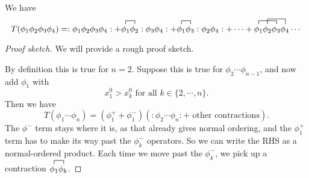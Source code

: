 \documentclass[a4paper]{article}
\begin{document}
\begin{eg}
  We have
  \[
    T(\phi_1 \phi_2 \phi_3 \phi_4) = :\phi_1 \phi_2 \phi_3 \phi_4: + \contraction{}{\phi_1}{}{\phi_2}\phi_1 \phi_2 : \phi_3 \phi_4: + \contraction{}{\phi_1}{}{\phi_3}\phi_1 \phi_3:\phi_2 \phi_4: + \cdots + \contraction{}{\phi_1}{\phi_2}{\phi_3}\contraction[1.5ex]{\phi_1}{\phi_2}{\phi_3}{\phi_4}\phi_1\phi_2\phi_3\phi_4\cdots
  \]
\end{eg}

\begin{proof}[Proof sketch]
  We will provide a rough proof sketch.

  By definition this is true for $n = 2$. Suppose this is true for $\phi_2 \cdots \phi_{n - 1}$, and now add $\phi_1$ with
  \[
    x_1^0 > x_k^0 \text{ for all }k \in \{2, \cdots, n\}.
  \]
  Then we have
  \[
    T(\phi_1 \cdots \phi_n) = (\phi_1^+ + \phi_1^-)(:\phi_2 \cdots \phi_n: + \text{ other contractions}).
  \]
  The $\phi^-$ term stays where it is, as that already gives normal ordering, and the $\phi_1^+$ term has to make its way past the $\phi_k^-$ operators. So we can write the RHS as a normal-ordered product. Each time we move past the $\phi_k^-$, we pick up a contraction $\contraction{}{\phi_1}{}{\phi_n}\phi_1\phi_k$. %
\end{proof}
\end{document}
